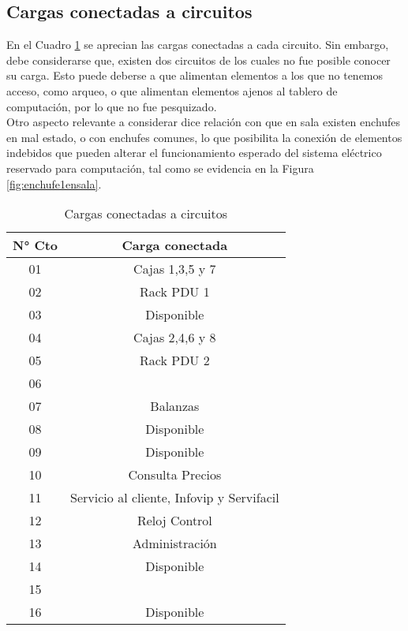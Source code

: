 \documentclass{article}
\begin{document}
\subsection{Cargas conectadas a circuitos}
En el Cuadro \ref{tab:Cargas_conectadas} se aprecian las cargas conectadas a cada circuito. Sin embargo, debe considerarse que, existen dos circuitos de los cuales no fue posible conocer su carga. Esto puede deberse a que alimentan elementos a los que no tenemos acceso, como arqueo, o que alimentan elementos ajenos al tablero de computación, por lo que no fue pesquizado.\\
Otro aspecto relevante a considerar dice relación con que en sala existen enchufes en mal estado, o con enchufes comunes, lo que posibilita la conexión de elementos indebidos que pueden alterar el funcionamiento esperado del sistema eléctrico reservado para computación, tal como se evidencia en la Figura \ref{fig:enchufe1ensala}.
\begin{center}
    \begin{table}[H]
        \centering
        \begin{tabular}{cc}
            N° Cto & Carga conectada \\\hline
            01 & Cajas 1,3,5 y 7\\
            02 & Rack PDU 1\\
            03 & Disponible \\
            04 & Cajas 2,4,6 y 8\\
            05 & Rack PDU 2\\
            06 & \\
            07 & Balanzas\\
            08 & Disponible\\
            09 & Disponible\\
            10 & Consulta Precios\\
            11 & Servicio al cliente, Infovip y Servifacil\\
            12 & Reloj Control\\
            13 & Administración\\
            14 & Disponible\\
            15 & \\
            16 & Disponible\\
        \end{tabular}
        \caption{Cargas conectadas a circuitos}
        \label{tab:Cargas_conectadas}
    \end{table}
\end{center}
\end{document}
